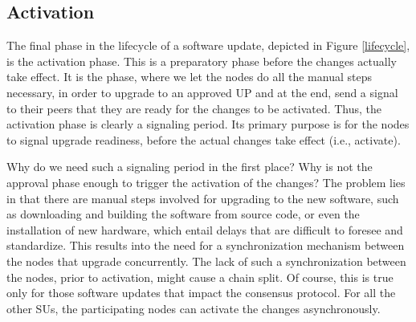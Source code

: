 \subsection{Activation}

The final phase in the lifecycle of a software update, depicted in Figure \ref{lifecycle}, is the activation phase. This is a preparatory phase before the changes actually take effect. It is the phase, where we let the nodes do all the manual steps necessary, in order to upgrade to an approved UP and at the end, send a signal to their peers that they are ready for the changes to be activated. Thus, the activation phase is clearly a signaling period. Its primary purpose is for the nodes to signal upgrade readiness, before the actual changes take effect (i.e., activate). 

Why do we need such a signaling period in the first place? Why is not the approval phase enough to trigger the activation of the changes? The problem lies in that there are manual steps involved for upgrading to the new software, such as downloading and building the software from source code, or even the installation of new hardware, which entail delays that are difficult to foresee and standardize. This results into the need for a synchronization mechanism between the nodes that upgrade concurrently. The lack of such a synchronization between the nodes, prior to activation, might cause a chain split. Of course, this is true only for those software updates that impact the consensus protocol. For all the other SUs, the participating nodes can activate the changes asynchronously. %


